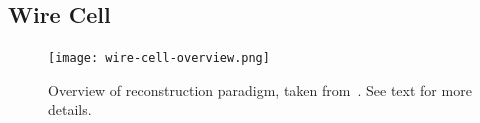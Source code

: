 

\subsection{Wire Cell}

\begin{figure}[!ht]
 \texttt{[image: wire-cell-overview.png]}
\caption[Overview of  reconstruction paradigm]{Overview of reconstruction paradigm, taken from~\cite{ref:wc_talk}. 
See text for more details.}
\label{wire-cell-overview}
\end{figure}


